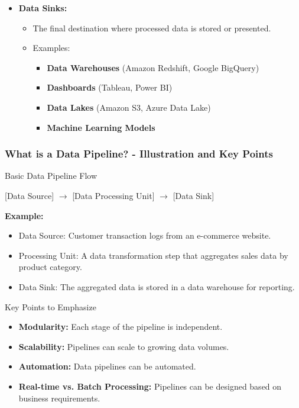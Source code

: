\documentclass[aspectratio=169]{beamer}
\begin{document}
\begin{frame}[fragile]
\begin{itemize}
        \item \textbf{Data Sinks:}
            \begin{itemize}
                \item The final destination where processed data is stored or presented.
                \item Examples:
                    \begin{itemize}
                        \item \textbf{Data Warehouses} (Amazon Redshift, Google BigQuery)
                        \item \textbf{Dashboards} (Tableau, Power BI)
                        \item \textbf{Data Lakes} (Amazon S3, Azure Data Lake)
                        \item \textbf{Machine Learning Models}
                    \end{itemize}
            \end{itemize}
    \end{itemize}
\end{frame}

\begin{frame}[fragile]
    \frametitle{What is a Data Pipeline? - Illustration and Key Points}
    \begin{block}{Basic Data Pipeline Flow}
        \begin{center}
            [Data Source] $\rightarrow$ [Data Processing Unit] $\rightarrow$ [Data Sink]
        \end{center}
    \end{block}

    \textbf{Example:}
    \begin{itemize}
        \item Data Source: Customer transaction logs from an e-commerce website.
        \item Processing Unit: A data transformation step that aggregates sales data by product category.
        \item Data Sink: The aggregated data is stored in a data warehouse for reporting.
    \end{itemize}

    \begin{block}{Key Points to Emphasize}
        \begin{itemize}
            \item \textbf{Modularity:} Each stage of the pipeline is independent.
            \item \textbf{Scalability:} Pipelines can scale to growing data volumes.
            \item \textbf{Automation:} Data pipelines can be automated.
            \item \textbf{Real-time vs. Batch Processing:} Pipelines can be designed based on business requirements.
        \end{itemize}
    \end{block}
\end{frame}
\end{document}
